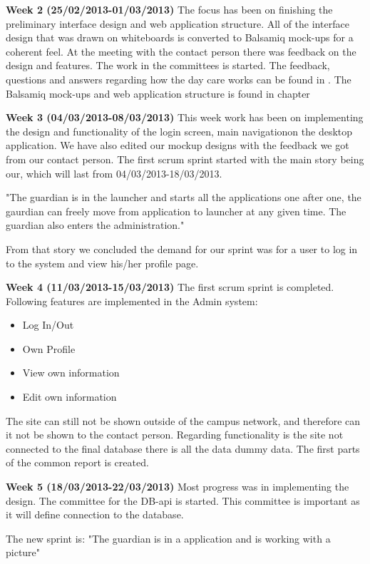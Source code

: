 \textbf{Week 2 (25/02/2013-01/03/2013)}
The focus has been on finishing the preliminary interface design and web application structure.
All of the interface design that was drawn on whiteboards is converted to Balsamiq mock-ups for a coherent feel.
At the meeting with the contact person there was feedback on the design and features. 
The work in the committees is started. 
The feedback, questions and answers regarding how the day care works can be found in .
The Balsamiq mock-ups and web application structure is found in chapter  

\textbf{Week 3 (04/03/2013-08/03/2013)}
This week work has been on implementing the design and functionality of the login screen, main navigationon the desktop application.  We have also edited our mockup designs with the feedback we got from our contact person. 
The first scrum sprint started with the main story being  our, which will last from 04/03/2013-18/03/2013. 

"The guardian is in the launcher and starts all the applications one after one, the gaurdian can freely move from application to launcher at any given time.
The guardian also enters the administration."

From that story we concluded the demand for our sprint was for a user to log in to the system and view his/her profile page. 

\textbf{Week 4 (11/03/2013-15/03/2013) }
The first scrum sprint is completed. 
Following features are implemented in the Admin system:
\begin{itemize}
	\item Log In/Out
	\item Own Profile
	\item View own information
	\item Edit own information
\end{itemize}
The site can still not be shown outside of the campus network, and therefore can it not be shown to the contact person.
Regarding functionality is the site not connected to the final database there is all the data dummy data.  
The first parts of the common report is created.

\textbf{Week 5 (18/03/2013-22/03/2013)}
Most progress was in implementing the design. The committee for the DB-api is started. This committee is important as it will define connection to the database. 

The new sprint is:
"The guardian is in a application and is working with a picture"

